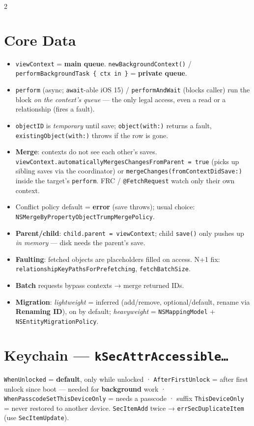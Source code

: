 \documentclass[8pt]{extarticle}
\begin{document}
\begin{multicols}{2}
\section{Core Data}
\begin{itemize}
  \item \texttt{viewContext} = \textbf{main queue}. \texttt{newBackgroundContext()} /
        \texttt{performBackgroundTask \{ ctx in \}} = \textbf{private queue}.
  \item \texttt{perform} (async; \texttt{await}-able iOS 15) / \texttt{performAndWait}
        (blocks caller) run the block \emph{on the context's queue} — the only legal
        access, even a read or a relationship (fires a fault).
  \item \texttt{objectID} is \emph{temporary} until save; \texttt{object(with:)} returns a
        fault, \texttt{existingObject(with:)} throws if the row is gone.
  \item \textbf{Merge}: contexts do not see each other's saves.
        \texttt{viewContext.automaticallyMergesChangesFromParent = true} (picks up sibling
        saves via the coordinator) or \texttt{mergeChanges(fromContextDidSave:)} inside the
        target's \texttt{perform}. FRC / \texttt{@FetchRequest} watch only their own context.
  \item Conflict policy default = \textbf{error} (save throws); usual choice: \\
        \texttt{NSMergeByPropertyObjectTrumpMergePolicy}.
  \item \textbf{Parent/child}: \texttt{child.parent = viewContext}; child \texttt{save()}
        only pushes up \emph{in memory} — disk needs the parent's save.
  \item \textbf{Faulting}: fetched objects are placeholders filled on access. N+1 fix:
        \texttt{relationshipKeyPathsForPrefetching}, \texttt{fetchBatchSize}.
  \item \textbf{Batch} requests bypass contexts → merge returned IDs.
  \item \textbf{Migration}: \emph{lightweight} = inferred (add/remove, optional/default,
        rename via \textbf{Renaming ID}), on by default; \emph{heavyweight} =
        \texttt{NSMappingModel} + \texttt{NSEntityMigrationPolicy}.
\end{itemize}

\section{Keychain — \texttt{kSecAttrAccessible…}}
\texttt{WhenUnlocked} = \textbf{default}, only while unlocked ·
\texttt{AfterFirstUnlock} = after first unlock since boot — needed for \textbf{background}
work · \texttt{WhenPasscodeSetThisDeviceOnly} = needs a passcode · suffix
\texttt{ThisDeviceOnly} = never restored to another device. \texttt{SecItemAdd} twice →
\texttt{errSecDuplicateItem} (use \texttt{SecItemUpdate}).


\end{multicols}
\end{document}
